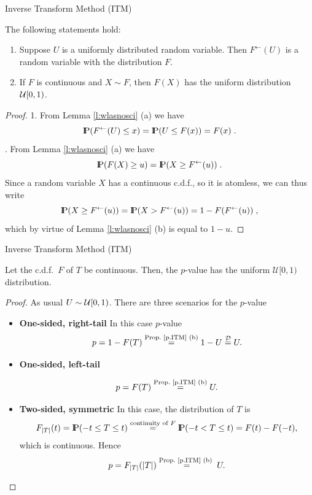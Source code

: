 \documentclass[aspectratio=169]{beamer}
\newcommand{\Prob}{{\rm I\hspace{-0.8mm}P}}
\begin{document}
\begin{frame}{Inverse Transform Method (ITM)}

 \begin{myProp}\label{p.ITM}
The following statements hold:
\begin{enumerate}
    \item Suppose $U$ is a uniformly distributed random variable. Then $F^{\leftarrow}(U)$ is a random variable with the distribution  $F$.
    \item If $F$ is continuous and  $X\sim F$, then $F(X)$ has the uniform distribution  ${\cal U}[0,1)$.
\end{enumerate}
\end{myProp}

\begin{proof}
1. From Lemma \ref{l:wlasnosci} (a) we have
$$\Prob(F^{\leftarrow}(U)\le x)=\Prob(U\le F(x))=F(x)\;.$$
\pause
{}. From Lemma \ref{l:wlasnosci} (a) we have
$$\Prob(F(X)\ge u)=\Prob(X\ge F^{\leftarrow}(u))\;.$$
Since a random variable $X$ has a continuous c.d.f., so it is atomless,
we can thus write
$$\Prob(X\ge F^{\leftarrow}(u))=\Prob(X> F^{\leftarrow}(u))=1-F(F^{\leftarrow}(u))\;,$$
which by virtue of Lemma \ref{l:wlasnosci} (b) is equal to $1-u$.
\end{proof}

\end{frame}





\begin{frame}{Inverse Transform Method (ITM)}
 \begin{myCor}\label{cor:p-value-uniform}
 Let the c.d.f.\ $F$ of $T$ be continuous. Then, the $p$-value has
 the uniform $\mathcal{U}[0,1)$ distribution.
\end{myCor}

\begin{proof}
As usual $U\sim{\cal U}[0,1)$.
There are three scenarios for the $p$-value
\begin{itemize}
 \item \textbf{One-sided, right-tail}
In this case
$p$-value
$$p= 1-F(T) \stackrel{\textrm{Prop.~\ref{p.ITM} (b)}}{=}1-U\stackrel{\mathcal{D}}{=}U.$$
\pause
\item \textbf{One-sided, left-tail}\par
$$p= F(T) \stackrel{\textrm{Prop.~\ref{p.ITM} (b)}}{=}U.$$
\pause
\item \textbf{Two-sided, symmetric}
In this case, the distribution of $T$ is
$$F_{|T|}(t)=\Prob(-t\le T\le t) \stackrel{\textrm{continuity of } F}=\Prob(-t< T\le t)=F(t)-F(-t),$$
which is continuous. Hence
\[p=F_{|T|}(|T|) \stackrel{\textrm{Prop.~\ref{p.ITM} (b) }}{=}U. \]

\end{itemize}

\end{proof}

\end{frame}
\end{document}
